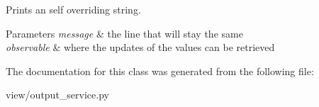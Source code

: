 Prints an self overriding string. 


\begin{DoxyParams}{Parameters}
{\em message} & the line that will stay the same \\
\hline
{\em observable} & where the updates of the values can be retrieved \\
\hline
\end{DoxyParams}


The documentation for this class was generated from the following file\+:\begin{DoxyCompactItemize}
\item 
view/output\+\_\+service.\+py\end{DoxyCompactItemize}
